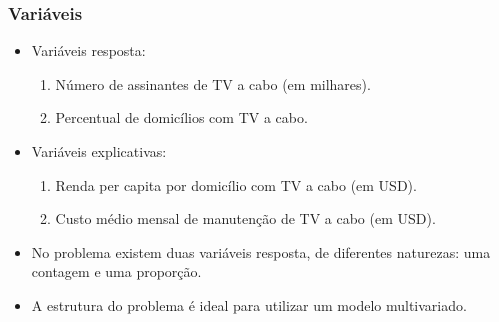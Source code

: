 \documentclass[10pt,
  aspectratio=169,
  serif,
  mathserif,
  professionalfont,
  compress,
  handout,
  ]{beamer}\usepackage[]{graphicx}\usepackage[]{color}
\begin{document}
\begin{frame}

\frametitle{Variáveis}

\begin{itemize}
  
  \itemsep 2ex
  
  \item Variáveis resposta:
  
    \begin{enumerate}
      \item Número de assinantes de TV a cabo (em milhares).
      \item Percentual de domicílios com TV a cabo.
    \end{enumerate}
    
  \item Variáveis explicativas:
  
    \begin{enumerate}
      \item Renda per capita por domicílio com TV a cabo (em USD).
      \item Custo médio mensal de manutenção de TV a cabo (em USD).
    \end{enumerate}
  
  \item No problema existem duas variáveis resposta, de diferentes naturezas: uma contagem e uma proporção.
  
  \item A estrutura do problema é ideal para utilizar um modelo multivariado.
  
\end{itemize}

\end{frame}

\end{document}
